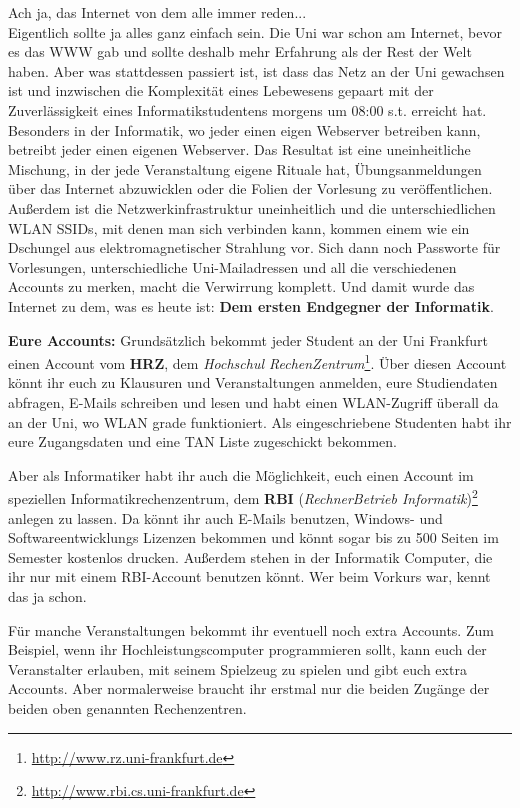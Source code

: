 Ach ja, das Internet von dem alle immer reden...\\

\spaltenanfang
Eigentlich sollte ja alles ganz einfach sein.
Die Uni war schon am Internet, bevor es das WWW gab und sollte deshalb mehr Erfahrung als der Rest der Welt haben.
Aber was stattdessen passiert ist, ist dass das Netz an der Uni gewachsen ist
und inzwischen die Komplexit\"at eines Lebewesens gepaart mit der
Zuverl\"assigkeit eines Informatikstudentens morgens um 08:00 s.t. erreicht
hat. Besonders in der Informatik, wo jeder einen eigen Webserver betreiben
kann, betreibt jeder einen eigenen Webserver. Das Resultat ist eine
uneinheitliche Mischung, in der jede Veranstaltung eigene Rituale hat,
\"Ubungsanmeldungen \"uber das Internet abzuwicklen oder die Folien der
Vorlesung zu ver\"offentlichen. Au{\ss}erdem ist die Netzwerkinfrastruktur
uneinheitlich und die unterschiedlichen WLAN SSIDs, mit denen man sich
verbinden kann, kommen einem wie ein Dschungel aus elektromagnetischer
Strahlung vor. Sich dann noch Passworte f\"ur Vorlesungen, unterschiedliche
Uni-Mailadressen und all die verschiedenen Accounts zu merken, macht die
Verwirrung komplett.  Und damit wurde das Internet zu dem, was es heute ist:
\textbf{Dem ersten Endgegner der Informatik}.

\textbf{Eure Accounts:}
Grunds\"atzlich bekommt jeder Student an der Uni Frankfurt einen Account vom \textbf{HRZ}, dem \textit{Hochschul RechenZentrum}\footnote{\url{http://www.rz.uni-frankfurt.de}}.
\"Uber diesen Account k\"onnt ihr euch zu Klausuren und Veranstaltungen anmelden, eure Studiendaten abfragen, E-Mails schreiben und lesen und habt einen WLAN-Zugriff \"uberall da an der Uni, wo WLAN grade funktioniert. Als eingeschriebene Studenten habt ihr eure Zugangsdaten und eine TAN Liste zugeschickt bekommen. 

Aber als Informatiker habt ihr auch die M\"oglichkeit, euch einen Account im speziellen Informatikrechenzentrum, dem \textbf{RBI} (\textit{RechnerBetrieb Informatik})\footnote{\url{http://www.rbi.cs.uni-frankfurt.de}} anlegen zu lassen. Da k\"onnt ihr auch E-Mails benutzen, Windows- und Softwareentwicklungs Lizenzen bekommen und k\"onnt sogar bis zu 500 Seiten im Semester kostenlos drucken. Au{\ss}erdem stehen in der Informatik Computer, die ihr nur mit einem RBI-Account benutzen k\"onnt. Wer beim Vorkurs war, kennt das ja schon.

F\"ur manche Veranstaltungen bekommt ihr eventuell noch extra Accounts. Zum Beispiel, wenn ihr Hochleistungscomputer programmieren sollt, kann euch der Veranstalter erlauben, mit seinem Spielzeug zu spielen und gibt euch extra Accounts. Aber normalerweise braucht ihr erstmal nur die beiden Zug\"ange der beiden oben genannten Rechenzentren.

